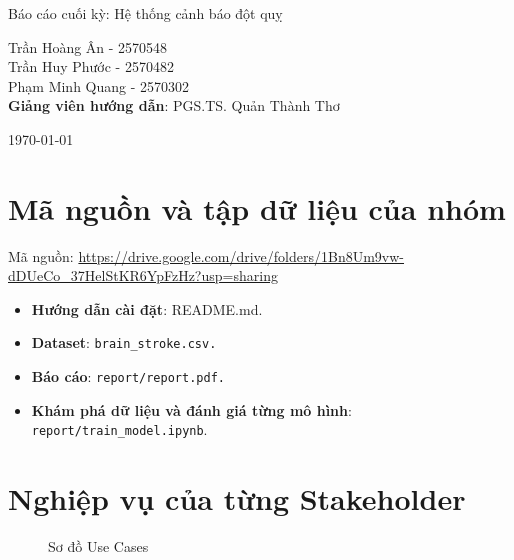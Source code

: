 ﻿\documentclass{article}
\begin{document}
\begin{titlepage}
        \centering
        {\Huge Báo cáo cuối kỳ: Hệ thống cảnh báo đột quỵ\par}
        \vspace{0.5em}
        \vspace{2cm}

        \begin{flushright}
            \normalsize
            Trần Hoàng Ân - 2570548\\
            Trần Huy Phước - 2570482\\
            Phạm Minh Quang - 2570302\\
            \vspace{1em}
            \textbf{Giảng viên hướng dẫn}: PGS.TS. Quản Thành Thơ 
        \end{flushright}

        \vfill

        \begin{center}
            \today
        \end{center}
    \end{titlepage}

\newpage
\tableofcontents
\newpage

\section{Mã nguồn và tập dữ liệu của nhóm}
Mã nguồn: \href{https://drive.google.com/drive/folders/1Bn8Um9vw-dDUeCo_37HelStKR6YpFzHz?usp=sharing}{https://drive.google.com/drive/folders/1Bn8Um9vw-dDUeCo\_37HelStKR6YpFzHz?usp=sharing}
\begin{itemize}
    \item \textbf{Hướng dẫn cài đặt}: README.md.
    \item \textbf{Dataset}: \texttt{brain\_stroke.csv.}
    \item \textbf{Báo cáo}: \texttt{report/report.pdf.}
    \item \textbf{Khám phá dữ liệu và đánh giá từng mô hình}: \texttt{report/train\_model.ipynb}.
\end{itemize}
\section{Nghiệp vụ của từng Stakeholder}
\begin{figure}[H]
    \centering
    
    \caption{Sơ đồ Use Cases}
    \label{fig:usecases}
\end{figure}
\FloatBarrier
\end{document}
